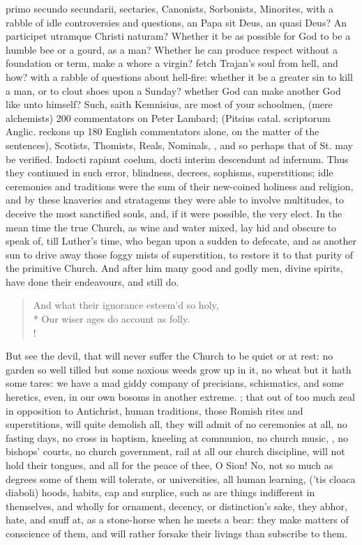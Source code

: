 {primo secundo secundarii, sectaries, Canonists, Sorbonists, Minorites,
with a rabble of idle controversies and questions, an Papa sit
Deus, an quasi Deus? An participet utramque Christi naturam? Whether it
be as possible for God to be a humble bee or a gourd, as a man? Whether
he can produce respect without a foundation or term, make a whore a
virgin? fetch Trajan's soul from hell, and how? with a rabble of
questions about hell-fire: whether it be a greater sin to kill a man,
or to clout shoes upon a Sunday? whether God can make another God like
unto himself? Such, saith Kemnisius, are most of your schoolmen, (mere
alchemists) 200 commentators on Peter Lambard; (Pitsius catal.
scriptorum Anglic. reckons up 180 English commentators alone, on the
matter of the sentences), Scotists, Thomists, Reals, Nominals, \etc{}, and
so perhaps that of St. \Austin{} may be verified. Indocti rapiunt
coelum, docti interim descendunt ad infernum. Thus they continued in
such error, blindness, decrees, sophisms, superstitions; idle
ceremonies and traditions were the sum of their new-coined holiness and
religion, and by these knaveries and stratagems they were able to
involve multitudes, to deceive the most sanctified souls, and, if it
were possible, the very elect. In the mean time the true Church, as
wine and water mixed, lay hid and obscure to speak of, till Luther's
time, who began upon a sudden to defecate, and as another sun to drive
away those foggy mists of superstition, to restore it to that purity of
the primitive Church. And after him many good and godly men, divine
spirits, have done their endeavours, and still do.

\begin{verse}%
And what their ignorance esteem'd so holy,\\*
Our wiser ages do account as folly.\\!
\end{verse}%

But see the devil, that will never suffer the Church to be quiet or at
rest: no garden so well tilled but some noxious weeds grow up in it, no
wheat but it hath some tares: we have a mad giddy company of
precisians, schismatics, and some heretics, even, in our own bosoms in
another extreme. ;
that out of too much zeal in opposition to Antichrist, human
traditions, those Romish rites and superstitions, will quite demolish
all, they will admit of no ceremonies at all, no fasting days, no cross
in baptism, kneeling at communion, no church music, \etc{}, no bishops'
courts, no church government, rail at all our church discipline, will
not hold their tongues, and all for the peace of thee, O Sion! No, not
so much as degrees some of them will tolerate, or universities, all
human learning, ('tis cloaca diaboli) hoods, habits, cap and surplice,
such as are things indifferent in themselves, and wholly for ornament,
decency, or distinction's sake, they abhor, hate, and snuff at, as a
stone-horse when he meets a bear: they make matters of conscience of
them, and will rather forsake their livings than subscribe to them.

}
